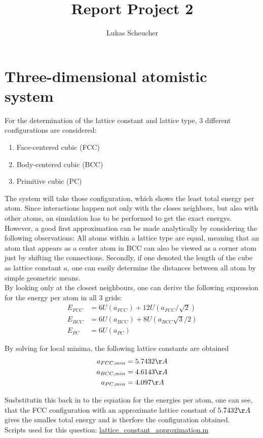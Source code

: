 \documentclass[10pt,a4paper]{report}
\title{Report Project 2}
\author{Lukas Scheucher}
\begin{document}
\chapter{Three-dimensional atomistic system}
For the determination of the lattice constant and lattice type, 3 different configurations are considered:
\begin{enumerate}
\item Face-centered cubic (FCC)
\item Body-centered cubic (BCC)
\item Primitive cubic     (PC)
\end{enumerate}
The system will take those configuration, which shows the least total energy per atom. Since interactions happen not only with the closes neighbors, but also with other atoms, an simulation has to be performed to get the exact energys.\\
However, a good first approximation can be made analytically by considering the following observations: All atoms within a lattice type are equal, meaning that an atom that appears as a center atom in BCC can also be viewed as a corner atom just by shifting the connections. Secondly, if one denoted the length of the cube as lattice constant $a$, one can easily determine the distances between all atom by simple geometric means.\\
By looking only at the closest neighbours, one can derive the following expression for the energy per atom in all 3 grids:
\begin{align}
E_{FCC}&=6 U(a_{FCC})+12 U(a_{FCC}/\sqrt{2}) \\
E_{BCC}&=6 U(a_{BCC})+8 U(a_{BCC} \sqrt{3}/2) \\
E_{PC} &=6 U(a_{PC})
\end{align}

By solving for local minima, the following lattice constants are obtained
\begin{align}
a_{FCC,min}&= 5.7432\AA\\
a_{BCC,min}&= 4.6143\AA\\
a_{PC,min} &= 4.097\AA\\
\end{align}

Susbstitutin this back in to the equation for the energies per atom, one can see, that the FCC configuration with an approximate lattice constant of $5.7432\AA$ gives the smalles total energy and is therfore the configuration obtained.\\

Scripts used for this question:
\href{../../lattice_constant_approximation.m}{lattice\_constant\_approximation.m}
\end{document}
